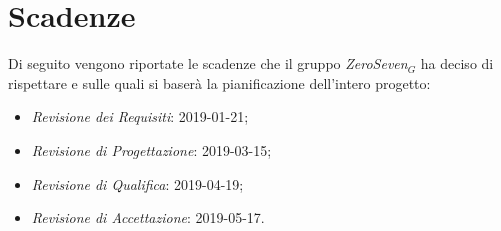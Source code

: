 \section{Scadenze}
Di seguito vengono riportate le scadenze che il gruppo \textit{ZeroSeven$_{G}$} ha deciso di rispettare e sulle quali si baserà la pianificazione dell'intero progetto:
\begin{itemize}
	\item \textit{Revisione dei Requisiti}: 2019-01-21;
	\item \textit{Revisione di Progettazione}: 2019-03-15;
	\item \textit{Revisione di Qualifica}: 2019-04-19;
	\item \textit{Revisione di Accettazione}: 2019-05-17.
\end{itemize}